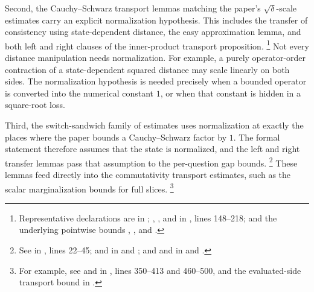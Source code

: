 \documentclass[11pt]{article}
\begin{document}
Second, the Cauchy--Schwarz transport lemmas matching the paper's
$\sqrt\delta$-scale estimates carry an explicit normalization hypothesis.
This includes the transfer of consistency using state-dependent distance, the
easy approximation lemma, and both left and right clauses of the inner-product
transport proposition.
\footnote{Representative declarations are  in
;
, , and
 in ,
lines 148--218; and the underlying pointwise bounds
, ,
and .}
Not every distance manipulation needs normalization. For example, a purely
operator-order contraction of a state-dependent squared distance may scale
linearly on both sides. The normalization hypothesis is needed precisely when a
bounded operator is converted into the numerical constant $1$, or when that
constant is hidden in a square-root loss.

Third, the switch-sandwich family of estimates uses normalization at exactly the
places where the paper bounds a Cauchy--Schwarz factor by $1$. The formal
statement therefore assumes that the state is normalized, and the left and right
transfer lemmas pass that assumption to the per-question gap bounds.
\footnote{See  in
, lines
22--45;  and 
in  and
; and
 and 
in  and
.}
These lemmas feed directly into the commutativity transport estimates, such as
the scalar marginalization bounds for full slices.
\footnote{For example, see  and
 in
, lines 350--413 and
460--500, and the evaluated-side transport bound
 in
.}
\end{document}
